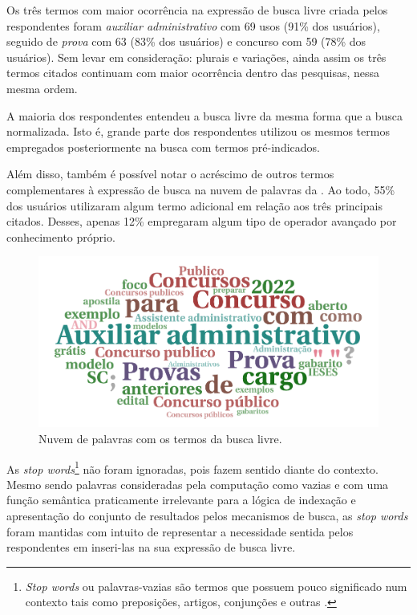 \documentclass[portuguese]{textolivre}
\begin{document}
Os três termos com maior ocorrência na expressão de busca livre criada pelos respondentes foram \textit{auxiliar administrativo} com 69 usos (91\% dos usuários), seguido de \textit{prova} com 63 (83\% dos usuários) e concurso com 59 (78\% dos usuários). Sem levar em consideração: plurais e variações, ainda assim os três termos citados continuam com maior ocorrência dentro das pesquisas, nessa mesma ordem.

A maioria dos respondentes entendeu a busca livre da mesma forma que a busca normalizada. Isto é, grande parte dos respondentes utilizou os mesmos termos empregados posteriormente na busca com termos pré-indicados.

Além disso, também é possível notar o acréscimo de outros termos complementares à expressão de busca na nuvem de palavras da . Ao todo, 55\% dos usuários utilizaram algum termo adicional em relação aos três principais citados. Desses, apenas 12\% empregaram algum tipo de operador avançado por conhecimento próprio.

\begin{figure}[h!]
    \centering
    \includegraphics[width=0.8\linewidth]{fig-010.png}
    \caption{Nuvem de palavras com os termos da busca livre.}
    \label{fig14}
\end{figure}

As \textit{stop words}\footnote{\textit{Stop words} ou palavras-vazias são termos que possuem pouco significado num contexto tais como preposições, artigos, conjunções e outras \cite{ibict_stop_2015}.} não foram ignoradas, pois fazem sentido diante do contexto. Mesmo sendo palavras consideradas pela computação como vazias e com uma função semântica praticamente irrelevante para a lógica de indexação e apresentação do conjunto de resultados pelos mecanismos de busca, as \textit{stop words} foram mantidas com intuito de representar a necessidade sentida pelos respondentes em inseri-las na sua expressão de busca livre.
\end{document}
